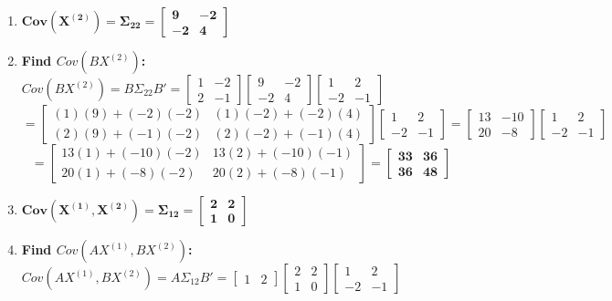 \documentclass[11pt,letterpaper]{article}
\begin{document}
\begin{enumerate}
    \item[(g)] $\mathbf{Cov(X^{(2)}) = \Sigma_{22} = \begin{bmatrix} 9 & -2 \\ -2 & 4 \end{bmatrix}}$
    \item[(h)] \textbf{Find $Cov(BX^{(2)})$:}
    $Cov(BX^{(2)}) = B \Sigma_{22} B' = \begin{bmatrix} 1 & -2 \\ 2 & -1 \end{bmatrix} \begin{bmatrix} 9 & -2 \\ -2 & 4 \end{bmatrix} \begin{bmatrix} 1 & 2 \\ -2 & -1 \end{bmatrix}$
    $$= \begin{bmatrix} (1)(9)+(-2)(-2) & (1)(-2)+(-2)(4) \\ (2)(9)+(-1)(-2) & (2)(-2)+(-1)(4) \end{bmatrix} \begin{bmatrix} 1 & 2 \\ -2 & -1 \end{bmatrix} = \begin{bmatrix} 13 & -10 \\ 20 & -8 \end{bmatrix} \begin{bmatrix} 1 & 2 \\ -2 & -1 \end{bmatrix}$$
    $$= \begin{bmatrix} 13(1)+(-10)(-2) & 13(2)+(-10)(-1) \\ 20(1)+(-8)(-2) & 20(2)+(-8)(-1) \end{bmatrix} = \mathbf{\begin{bmatrix} 33 & 36 \\ 36 & 48 \end{bmatrix}}$$
    \item[(i)] $\mathbf{Cov(X^{(1)}, X^{(2)}) = \Sigma_{12} = \begin{bmatrix} 2 & 2 \\ 1 & 0 \end{bmatrix}}$
    \item[(j)] \textbf{Find $Cov(AX^{(1)}, BX^{(2)})$:}
    $Cov(AX^{(1)}, BX^{(2)}) = A \Sigma_{12} B' = \begin{bmatrix} 1 & 2 \end{bmatrix} \begin{bmatrix} 2 & 2 \\ 1 & 0 \end{bmatrix} \begin{bmatrix} 1 & 2 \\ -2 & -1 \end{bmatrix}$

\end{enumerate}
\end{document}
